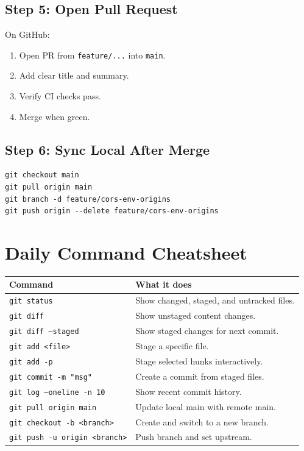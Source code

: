 \documentclass[11pt,a4paper]{article}
\begin{document}
\subsection{Step 5: Open Pull Request}
On GitHub:
\begin{enumerate}[leftmargin=1.5em]
  \item Open PR from \texttt{feature/...} into \texttt{main}.
  \item Add clear title and summary.
  \item Verify CI checks pass.
  \item Merge when green.
\end{enumerate}

\subsection{Step 6: Sync Local After Merge}
\begin{Verbatim}[fontsize=\small]
git checkout main
git pull origin main
git branch -d feature/cors-env-origins
git push origin --delete feature/cors-env-origins
\end{Verbatim}

\section{Daily Command Cheatsheet}
\begin{longtable}{p{} p{}}
\textbf{Command} & \textbf{What it does} \\
\hline
\texttt{git status} & Show changed, staged, and untracked files. \\
\texttt{git diff} & Show unstaged content changes. \\
\texttt{git diff --staged} & Show staged changes for next commit. \\
\texttt{git add <file>} & Stage a specific file. \\
\texttt{git add -p} & Stage selected hunks interactively. \\
\texttt{git commit -m "msg"} & Create a commit from staged files. \\
\texttt{git log --oneline -n 10} & Show recent commit history. \\
\texttt{git pull origin main} & Update local main with remote main. \\
\texttt{git checkout -b <branch>} & Create and switch to a new branch. \\
\texttt{git push -u origin <branch>} & Push branch and set upstream. \\
\end{longtable}
\end{document}

